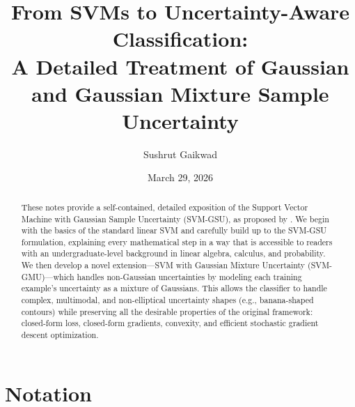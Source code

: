 \documentclass[11pt, letterpaper]{article}
\begin{document}
\title{\textbf{From SVMs to Uncertainty-Aware Classification:\\A Detailed Treatment of Gaussian and Gaussian Mixture Sample Uncertainty}}

\author{Sushrut Gaikwad}
\date{March 29, 2026}
\maketitle

\begin{abstract}
These notes provide a self-contained, detailed exposition of the Support Vector Machine with Gaussian Sample Uncertainty (SVM-GSU), as proposed by \textcite{tzelepis2017linear}. We begin with the basics of the standard linear SVM and carefully build up to the SVM-GSU formulation, explaining every mathematical step in a way that is accessible to readers with an undergraduate-level background in linear algebra, calculus, and probability. We then develop a novel extension---SVM with Gaussian Mixture Uncertainty (SVM-GMU)---which handles non-Gaussian uncertainties by modeling each training example's uncertainty as a mixture of Gaussians. This allows the classifier to handle complex, multimodal, and non-elliptical uncertainty shapes (e.g., banana-shaped contours) while preserving all the desirable properties of the original framework: closed-form loss, closed-form gradients, convexity, and efficient stochastic gradient descent optimization.
\end{abstract}

\newpage
\tableofcontents
\newpage

\section*{Notation}
\end{document}
